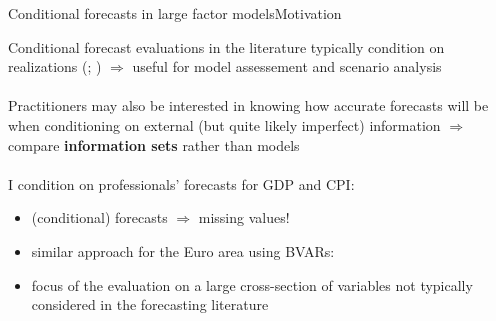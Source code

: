 \documentclass[xcolor=svgnames, 10pt, aspectratio=169]{beamer}
\begin{document}
\begin{frame}{Conditional forecasts in large factor models}{Motivation}
    
    Conditional forecast evaluations in the literature typically condition on realizations (\citealp[][\scriptsize \textbf{JAE}\normalsize]{clarkmccracken_2017_jae}; \citealp[][\scriptsize \textbf{IJoF}\normalsize]{bgl_2015ijf}) $\Longrightarrow$ useful for model assessement and scenario analysis \\~\\  

    Practitioners may also be interested in knowing how accurate forecasts will be when conditioning on external (but quite likely imperfect) information $\Longrightarrow$ compare \textbf{information sets} rather than models \\~\\  

    I condition on professionals' forecasts for GDP and CPI:
    \vspace{0.2cm}
    \begin{itemize}
        \item (conditional) forecasts $\Longrightarrow$  missing values!
        \item similar approach for the Euro area using BVARs: \citet[][\scriptsize \textbf{IJoF}\normalsize]{ganicsodendahl_2021_ijf}
        \item focus of the evaluation on a large cross-section of variables not typically considered in the forecasting literature 
    \end{itemize}    
    
      
\end{frame}
\end{document}
